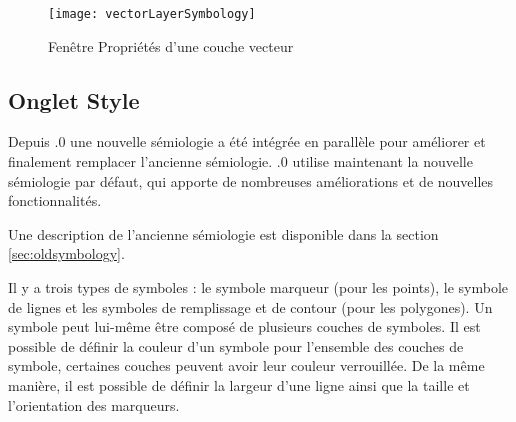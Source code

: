 \begin{figure}[ht]
  \begin{center}
  \texttt{[image: vectorLayerSymbology]}
  \caption{Fenêtre Propriétés d'une couche vecteur \nixcaption}\label{fig:vector_symbology}
\end{center}
\end{figure}

\subsection{Onglet Style}\label{sec:symbology}

Depuis .0 une nouvelle sémiologie a été intégrée en parallèle pour 
améliorer et finalement remplacer l'ancienne sémiologie. .0 utilise 
maintenant la nouvelle sémiologie par défaut, qui apporte de nombreuses 
améliorations et de nouvelles fonctionnalités.

Une description de l'ancienne sémiologie est disponible dans la section 
\ref{sec:oldsymbology}.


Il y a trois types de symboles : le symbole marqueur (pour les points), le symbole de 
lignes et les symboles de remplissage et de contour (pour les polygones). Un symbole peut lui-même 
être composé de plusieurs couches de symboles. Il est possible de définir la couleur 
d'un symbole pour l'ensemble des couches de symbole, certaines couches peuvent avoir 
leur couleur verrouillée. De la même manière, il est possible de définir la largeur 
d'une ligne ainsi que la taille et l'orientation des marqueurs.

